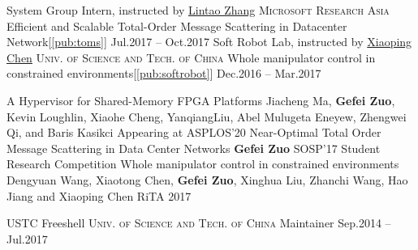 \documentclass[10pt,a4paper]{article}
\newcommand{\seperator}{\spacedhrule{0.5em}{-1em}}
\begin{document}
\headedsection
{System Group Intern, instructed by \href{https://www.microsoft.com/en-us/research/people/lintaoz/}{Lintao Zhang}}
{\textsc{Microsoft Research Asia}}
{
	\headedsubsection
	{Efficient and Scalable Total-Order Message Scattering in Datacenter Network[\ref{pub:toms}]}
	{Jul.2017 -- Oct.2017}
	{}
}
\headedsection
{Soft Robot Lab, instructed by \href{http://ai.ustc.edu.cn/}{Xiaoping Chen}}
{\textsc{Univ. of Science and Tech. of China}}
{
	\headedsubsection
	{Whole manipulator control in constrained environments[\ref{pub:softrobot}]}
	{Dec.2016 -- Mar.2017}
	{}
}

\seperator
{}
\publication
  {A Hypervisor for Shared-Memory FPGA Platforms\label{pub:optimus}}
  {\small Jiacheng Ma, \textbf{Gefei Zuo}, Kevin Loughlin, Xiaohe Cheng, YanqiangLiu, Abel Mulugeta Eneyew, Zhengwei Qi, and Baris Kasikci}
  {Appearing at ASPLOS'20}
\publication
	{Near-Optimal Total Order Message Scattering in Data Center Networks\label{pub:toms}}
	{\textbf{Gefei Zuo}}
	{SOSP'17 Student Research Competition}
\publication
	{Whole manipulator control in constrained environments\label{pub:softrobot}}
	{Dengyuan Wang, Xiaotong Chen, \textbf{Gefei Zuo}, Xinghua Liu, Zhanchi Wang, Hao Jiang and Xiaoping Chen}
	{RiTA 2017}

\seperator


\headedsection  %
{USTC Freeshell}
{\textsc{Univ. of Science and Tech. of China}} {
	\headedsubsection
	{Maintainer}
	{Sep.2014 -- Jul.2017}
	{}
	}
\end{document}
